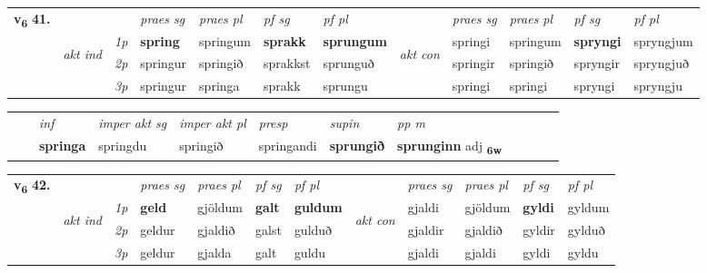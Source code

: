 \begin{tabular}{llllllllllll} \toprule
\multirow{4}{*}{{{\textbf{v{\textsubscript{6}}} \Large{\textbf{41.}}}}}  & &   &  \textit{praes sg}  & \textit{praes pl}  &\textit{ pf sg} & \textit{pf pl} &  &  \textit{praes sg}  & \textit{praes pl}  & \textit{pf sg} & \textit{pf pl } \\*
	\cmidrule{4-7} \cmidrule{9-12}
 & \multirow{3}{*}{\begin{turn}{90}\textit{akt ind}\end{turn}} & {\textit{1p}} & \textbf{spring} & springum    & \textbf{sprakk} & \textbf{sprungum} & \multirow{3}{*}{\begin{turn}{90}\textit{akt con}\end{turn}} &springi & springum & \textbf{spryngi} & spryngjum\\*
& &  {\textit{2p}} &  springur  & springið   & sprakkst & sprunguð & & springir & springið & spryngir & spryngjuð \\*
& &  {\textit{3p}} & springur & springa   & sprakk & sprungu & & springi & springi& spryngi & spryngju  \\*
\cmidrule{4-7} \cmidrule{9-12}
\end{tabular}


\begin{tabular}{llllllllllll}
 & & \textit{inf} & \textit{imper akt sg} & \textit{imper akt pl}   & \textit{presp} & \textit{supin}  & \textit{pp m}     \\*
  & & \textbf{springa} & springdu  & springið   & springandi &  \textbf{sprungið}  & \textbf{sprunginn} adj \textbf{\textsubscript{6w}} \\*
\cmidrule{1-12}
\end{tabular}



\begin{tabular}{llllllllllll} \toprule
\multirow{4}{*}{{{\textbf{v{\textsubscript{6}}} \Large{\textbf{42.}}}}}  & &   &  \textit{praes sg}  & \textit{praes pl}  &\textit{ pf sg} & \textit{pf pl} &  &  \textit{praes sg}  & \textit{praes pl}  & \textit{pf sg} & \textit{pf pl } \\*
	\cmidrule{4-7} \cmidrule{9-12}
 & \multirow{3}{*}{\begin{turn}{90}\textit{akt ind}\end{turn}} & {\textit{1p}} & \textbf{geld} & gjöldum    & \textbf{galt} & \textbf{guldum} & \multirow{3}{*}{\begin{turn}{90}\textit{akt con}\end{turn}} &gjaldi & gjöldum & \textbf{gyldi} & gyldum\\*
& &  {\textit{2p}} &  geldur  & gjaldið   & galst & gulduð & & gjaldir & gjaldið & gyldir & gylduð \\*
& &  {\textit{3p}} & geldur & gjalda   & galt & guldu & & gjaldi & gjaldi& gyldi & gyldu  \\*
\cmidrule{4-7} \cmidrule{9-12}
\end{tabular}



